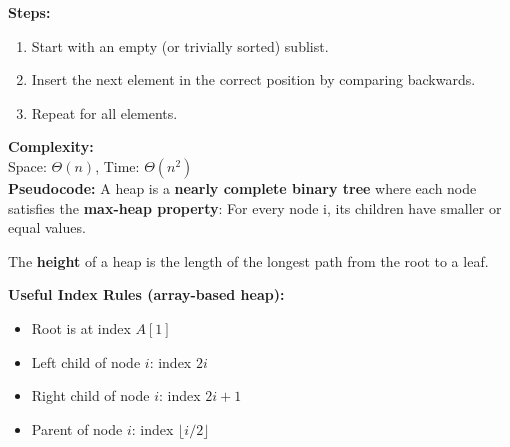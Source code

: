 \documentclass[a4paper,landscape]{article}
\begin{document}
\begin{multicols}{7}
\tcolorbox[mybox={Insertion Sort}]
\textbf{Steps:}
\begin{enumerate}[noitemsep, topsep=0pt]
    \item Start with an empty (or trivially sorted) sublist.
    \item Insert the next element in the correct position by comparing backwards.
    \item Repeat for all elements.
\end{enumerate}
\textbf{Complexity:}\\
Space: \( \Theta(n) \), Time: \( \Theta(n^2) \)\\
\textbf{Pseudocode:}
\noindent %
\endtcolorbox
\tcolorbox[mybox={Heap Sort}]
A heap is a \textbf{nearly complete binary tree} where each node satisfies the \textbf{max-heap property}:
For every node i, its children have smaller or equal values.

The \textbf{height} of a heap is the length of the longest path from the root to a leaf.

\textbf{Useful Index Rules (array-based heap):}
\begin{itemize}[noitemsep, topsep=0pt]
    \item Root is at index \( A[1] \)
    \item Left child of node \( i \): index \( 2i \)
    \item Right child of node \( i \): index \( 2i + 1 \)
    \item Parent of node \( i \): index \( \lfloor i/2 \rfloor \)
\end{itemize}


\end{multicols}
\end{document}
